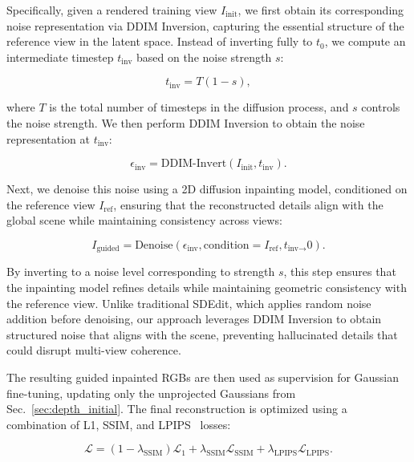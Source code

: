 Specifically, given a rendered training view \( I_{\text{init}} \), we first obtain its corresponding noise representation via DDIM Inversion, capturing the essential structure of the reference view in the latent space. Instead of inverting fully to \( t_0 \), we compute an intermediate timestep \( t_{\text{inv}} \) based on the noise strength \( s \):
\begin{small}
\begin{equation}  
t_{\text{inv}} = T (1 - s),  
\end{equation}  
\end{small}
where \( T \) is the total number of timesteps in the diffusion process, and \( s \) controls the noise strength. We then perform DDIM Inversion to obtain the noise representation at \( t_{\text{inv}} \):
\begin{small}
\begin{equation}  
\epsilon_{\text{inv}} = \text{DDIM-Invert}(I_{\text{init}}, t_{\text{inv}}).  
\end{equation}  
\end{small}

Next, we denoise this noise using a 2D diffusion inpainting model, conditioned on the reference view \( I_{\text{ref}} \), ensuring that the reconstructed details align with the global scene while maintaining consistency across views:
\begin{small}
\begin{equation}  
I_{\text{guided}} = \text{Denoise}(\epsilon_{\text{inv}}, \text{condition} = I_{\text{ref}}, t_{\text{inv} \rightarrow }0).  
\end{equation}  
\end{small}
% 
By inverting to a noise level corresponding to strength \( s \), this step ensures that the inpainting model refines details while maintaining geometric consistency with the reference view. Unlike traditional SDEdit, which applies random noise addition before denoising, our approach leverages DDIM Inversion to obtain structured noise that aligns with the scene, preventing hallucinated details that could disrupt multi-view coherence.  

The resulting guided inpainted RGBs are then used as supervision for Gaussian fine-tuning, updating only the unprojected Gaussians from Sec.~\ref{sec:depth_initial}. The final reconstruction is optimized using a combination of L1, SSIM, and LPIPS~\citep{zhang2018unreasonable} losses:  
\begin{small}
\begin{equation}  
\mathcal{L} = (1 - \lambda_\text{SSIM}) \mathcal{L}_1 + \lambda_\text{SSIM} \mathcal{L}_\text{SSIM} + \lambda_\text{LPIPS} \mathcal{L}_\text{LPIPS}.  
\end{equation}  
\end{small}




